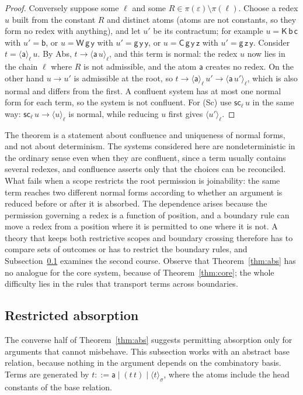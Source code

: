 \documentclass[11pt]{article}
\theoremstyle{definition}
\theoremstyle{remark}
\newcommand{\cC}{\mathsf{C}}
\newcommand{\cK}{\mathsf{K}}
\newcommand{\cW}{\mathsf{W}}
\newcommand{\br}[2]{\langle #1\rangle_{#2}}
\newcommand{\sca}[1]{\mathsf{sc}_{#1}}
\begin{document}
\begin{proof}
Conversely suppose some $\ell$ and some $R\in\pi(\varepsilon)\setminus\pi(\ell)$. Choose a redex $u$ built from the constant $R$ and distinct atoms (atoms are not constants, so they form no redex with anything), and let $u'$ be its contractum; for example $u=\cK\,\mathsf b\,\mathsf c$ with $u'=\mathsf b$, or $u=\cW\,\mathsf g\,\mathsf y$ with $u'=\mathsf g\,\mathsf y\,\mathsf y$, or $u=\cC\,\mathsf g\,\mathsf y\,\mathsf z$ with $u'=\mathsf g\,\mathsf z\,\mathsf y$. Consider $t=\br{\mathsf a}\ell\,u$. By Abs, $t\to\br{\mathsf a\,u}\ell$, and this term is normal: the redex $u$ now lies in the chain $\ell$ where $R$ is not admissible, and the atom $\mathsf a$ creates no redex. On the other hand $u\to u'$ is admissible at the root, so $t\to\br{\mathsf a}\ell\,u'\to\br{\mathsf a\,u'}\ell$, which is also normal and differs from the first. A confluent system has at most one normal form for each term, so the system is not confluent. For (Sc) use $\sca\ell\,u$ in the same way: $\sca\ell\,u\to\br u\ell$ is normal, while reducing $u$ first gives $\br{u'}\ell$.
\end{proof}

The theorem is a statement about confluence and uniqueness of normal forms, and not about determinism. The systems considered here are nondeterministic in the ordinary sense even when they are confluent, since a term usually contains several redexes, and confluence asserts only that the choices can be reconciled. What fails when a scope restricts the root permission is joinability: the same term reaches two different normal forms according to whether an argument is reduced before or after it is absorbed. The dependence arises because the permission governing a redex is a function of position, and a boundary rule can move a redex from a position where it is permitted to one where it is not. A theory that keeps both restrictive scopes and boundary crossing therefore has to compare sets of outcomes or has to restrict the boundary rules, and Subsection~\ref{sec:restricted} examines the second course. Observe that Theorem~\ref{thm:abs} has no analogue for the core system, because of Theorem~\ref{thm:core}; the whole difficulty lies in the rules that transport terms across boundaries.

\subsection{Restricted absorption}\label{sec:restricted}

The converse half of Theorem~\ref{thm:abs} suggests permitting absorption only for arguments that cannot misbehave. This subsection works with an abstract base relation, because nothing in the argument depends on the combinatory basis. Terms are generated by $t::=\mathsf a\mid(t\,t)\mid\br t\sigma$, where the atoms include the head constants of the base relation.
\end{document}
